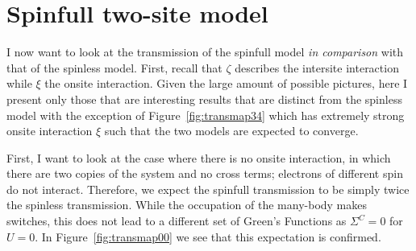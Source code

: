 \section{Spinfull two-site model}
I now want to look at the transmission of the spinfull model \emph{in comparison} with that of the spinless model. First, recall that $\zeta$ describes the intersite interaction while $\xi$ the onsite interaction. Given the large amount of possible pictures, here I present only those that are interesting results that are distinct from the spinless model with the exception of Figure~\ref{fig:transmap34} which has extremely strong onsite interaction $\xi$ such that the two models are expected to converge.


First, I want to look at the case where there is no onsite interaction, in which there are two copies of the system and no cross terms; electrons of different spin do not interact. Therefore, we expect the spinfull transmission to be simply twice the spinless transmission. While the occupation of the many-body makes switches, this does not lead to a different set of Green's Functions as $\Sigma^C=0$ for $U=0$. In Figure~\ref{fig:transmap00} we see that this expectation is confirmed. 

